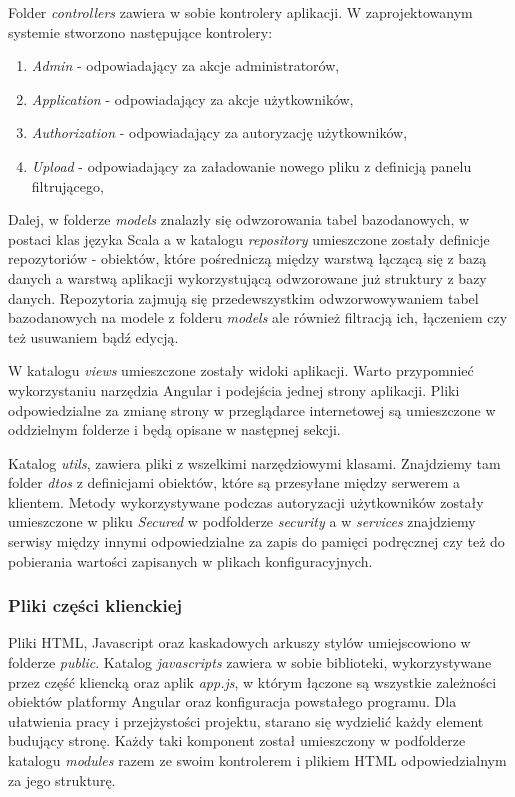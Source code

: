 \documentclass[a4paper,12pt,twoside]{article}
\begin{document}
Folder \textit{controllers} zawiera w sobie kontrolery aplikacji.
W zaprojektowanym systemie stworzono następujące kontrolery:
\begin{enumerate}[1)]
\item \textit{Admin} - odpowiadający za akcje administratorów,
\item \textit{Application} - odpowiadający za akcje użytkowników,
\item \textit{Authorization} - odpowiadający za autoryzację użytkowników,
\item \textit{Upload} - odpowiadający za załadowanie nowego pliku z definicją panelu filtrującego,
\end{enumerate}

Dalej, w folderze \textit{models} znalazły się odwzorowania tabel bazodanowych,
w postaci klas języka Scala a w katalogu \textit{repository} umieszczone 
zostały definicje repozytoriów - obiektów, które pośredniczą
między warstwą łączącą się z bazą danych a warstwą aplikacji 
wykorzystującą odwzorowane już struktury z bazy danych.
Repozytoria zajmują się przedewszystkim odwzorwowywaniem tabel bazodanowych na 
modele z folderu \textit{models} ale również filtracją ich, łączeniem
czy też usuwaniem bądź edycją.

W katalogu \textit{views} umieszczone zostały widoki aplikacji. 
Warto przypomnieć wykorzystaniu narzędzia Angular 
i podejścia jednej strony aplikacji. Pliki odpowiedzialne 
za zmianę strony w przeglądarce internetowej są umieszczone 
w oddzielnym folderze i będą opisane w następnej sekcji.

Katalog \textit{utils}, zawiera pliki z wszelkimi narzędziowymi
klasami. Znajdziemy tam folder \textit{dtos} z definicjami obiektów,
które są przesyłane między serwerem a klientem.
Metody wykorzystywane podczas autoryzacji użytkowników zostały umieszczone w pliku \textit{Secured} w podfolderze \textit{security} a w \textit{services} znajdziemy 
serwisy między innymi odpowiedzialne za zapis do pamięci podręcznej czy też
do pobierania wartości zapisanych w plikach konfiguracyjnych.
 
\newpage
\subsubsection{Pliki części klienckiej}

Pliki HTML, Javascript oraz kaskadowych arkuszy stylów umiejscowiono
w folderze \textit{public}. 
Katalog \textit{javascripts} zawiera w sobie biblioteki, wykorzystywane przez
część kliencką oraz aplik \textit{app.js}, w którym łączone są wszystkie 
zależności obiektów platformy Angular oraz konfiguracja powstałego programu.
Dla ułatwienia pracy i przejżystości projektu, starano się wydzielić każdy element budujący stronę. Każdy taki komponent został umieszczony w podfolderze
katalogu \textit{modules} razem ze swoim kontrolerem i plikiem HTML odpowiedzialnym 
za jego strukturę.
\end{document}
